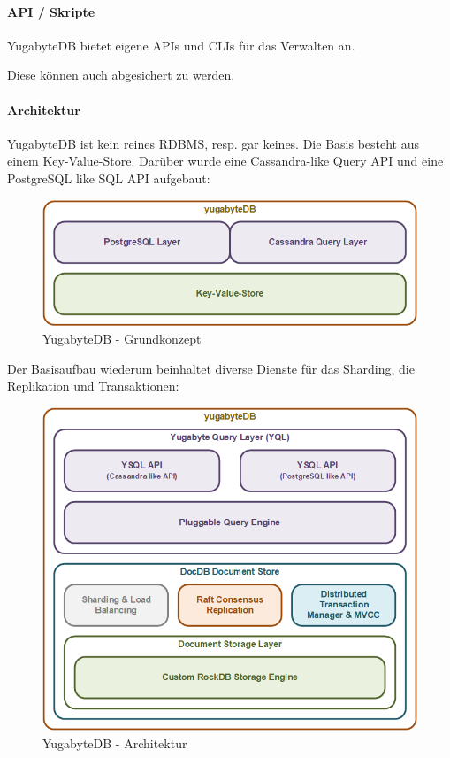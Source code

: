 \begin{flushleft}
    \paragraph{API / Skripte}
    YugabyteDB bietet eigene APIs \cite{ZXXLVVYW} und CLIs \cite{8846IPNK} für das Verwalten an.
\end{flushleft}
\begin{flushleft}
    Diese können auch abgesichert zu werden.
\end{flushleft}
\clearpage
\begin{flushleft}
    \paragraph{Architektur}
    YugabyteDB ist kein reines \Gls{RDBMS}, resp. gar keines.
    Die Basis besteht aus einem \Gls{Key-Value-Store}.
    Darüber wurde eine \Gls{Cassandra}-like Query API und eine \Gls{PostgreSQL} like SQL API aufgebaut:
    \begin{figure}[H]
        \centering
        \includegraphics[width=0.8\linewidth]{source/implementation/evaluation/postgresql_ha_solutions/yugabytedb/yugabytedb-concept}
        \caption{YugabyteDB - Grundkonzept}
        \label{fig:yugabytedb-concept}
    \end{figure}
\end{flushleft}
\begin{flushleft}
    Der Basisaufbau wiederum beinhaltet diverse Dienste für das Sharding, die Replikation und Transaktionen:
    \begin{figure}[H]
        \centering
        \includegraphics[width=0.8\linewidth]{source/implementation/evaluation/postgresql_ha_solutions/yugabytedb/yugabytedb-basic-archicture}
        \caption{YugabyteDB - Architektur}
        \label{fig:yugabytedb-basic-archicture}
    \end{figure}
\end{flushleft}
